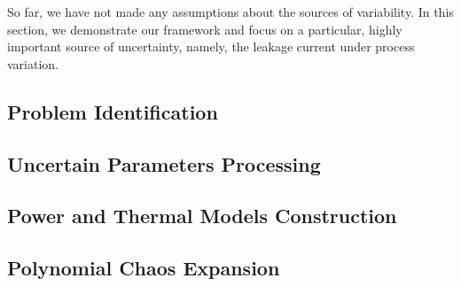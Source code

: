 So far, we have not made any assumptions about the sources of variability. In this section, we demonstrate our framework and focus on a particular, highly important source of uncertainty, namely, the leakage current under process variation.

\subsection{Problem Identification} 


\subsection{Uncertain Parameters Processing} 


\subsection{Power and Thermal Models Construction}  


\subsection{Polynomial Chaos Expansion} 

